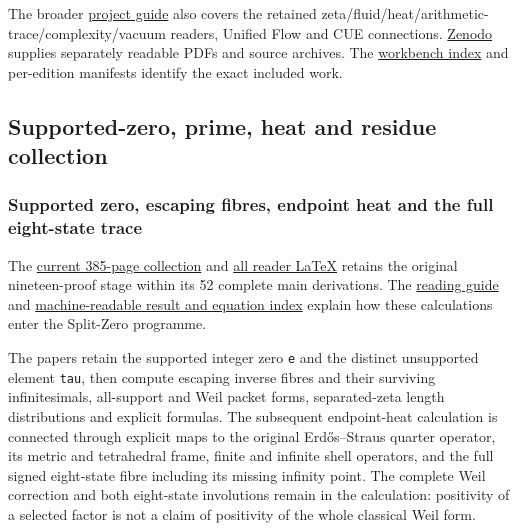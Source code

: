\documentclass[
]{article}
\begin{document}
The broader
\href{https://github.com/KokunoYumeto/zeta-function-research-reader}{project
guide} also covers the retained
zeta/fluid/heat/arithmetic-trace/complexity/vacuum readers, Unified Flow
and CUE connections.
\href{https://doi.org/10.5281/zenodo.22678085}{Zenodo} supplies
separately readable PDFs and source archives. The
\href{https://github.com/KokunoYumeto/zeta-function-research-reader/blob/main/WORKBENCHES.json}{workbench
index} and per-edition manifests identify the exact included work.

\subsection{Supported-zero, prime, heat and residue
collection}\label{supported-zero-prime-heat-and-residue-collection}

\subsubsection{Supported zero, escaping fibres, endpoint heat and the
full eight-state
trace}\label{supported-zero-escaping-fibres-endpoint-heat-and-the-full-eight-state-trace}

The
\href{https://github.com/KokunoYumeto/zeta-function-research-reader/blob/main/workbenches/splitzero-tandem/branches/tau-zero-prime-positivity/TAU_ZERO_PRIME_POSITIVITY.pdf}{current
385-page collection} and
\href{https://github.com/KokunoYumeto/zeta-function-research-reader/blob/main/workbenches/splitzero-tandem/branches/tau-zero-prime-positivity/TAU_ZERO_PRIME_POSITIVITY.tex}{all
reader LaTeX} retains the original nineteen-proof stage within its 52
complete main derivations. The
\href{https://github.com/KokunoYumeto/zeta-function-research-reader/blob/main/workbenches/splitzero-tandem/branches/tau-zero-prime-positivity/README.md}{reading
guide} and
\href{https://github.com/KokunoYumeto/zeta-function-research-reader/blob/main/workbenches/splitzero-tandem/branches/tau-zero-prime-positivity/PUBLICATION_INDEX.json}{machine-readable
result and equation index} explain how these calculations enter the
Split-Zero programme.

The papers retain the supported integer zero \texttt{e} and the distinct
unsupported element \texttt{tau}, then compute escaping inverse fibres
and their surviving infinitesimals, all-support and Weil packet forms,
separated-zeta length distributions and explicit formulas. The
subsequent endpoint-heat calculation is connected through explicit maps
to the original Erdős--Straus quarter operator, its metric and
tetrahedral frame, finite and infinite shell operators, and the full
signed eight-state fibre including its missing infinity point. The
complete Weil correction and both eight-state involutions remain in the
calculation: positivity of a selected factor is not a claim of
positivity of the whole classical Weil form.
\end{document}
